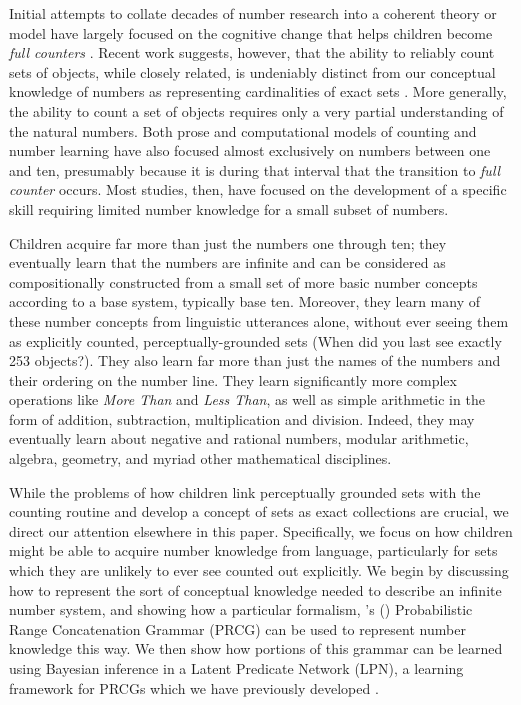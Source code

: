 \documentclass[10pt,letterpaper]{article}
\begin{document}
Initial attempts to collate decades of number research into a coherent
theory or model have largely focused on the cognitive change that
helps children become \emph{full counters}
\citep{Car2009,PianGoodTen2012}. Recent work suggests, however, that
the ability to reliably count sets of objects, while closely related,
is undeniably distinct from our conceptual knowledge of numbers as
representing cardinalities of exact sets
\citep{DavEngBar2012,izard2014toward,JarPianSpelEtAl2014}. More
generally, the ability to count a set of objects requires only a very
partial understanding of the natural numbers. Both prose and
computational models of counting and number learning have also focused
almost exclusively on numbers between one and ten, presumably because
it is during that interval that the transition to \emph{full counter}
occurs. Most studies, then, have focused on the development of a
specific skill requiring limited number knowledge for a small subset
of numbers.

Children acquire far more than just the numbers one through ten; they
eventually learn that the numbers are infinite and can be considered
as compositionally constructed from a small set of more basic number
concepts according to a base system, typically base ten. Moreover,
they learn many of these number concepts from linguistic utterances
alone, without ever seeing them as explicitly counted,
perceptually-grounded sets (When did you last see exactly 253
objects?). They also learn far more than just the names of the numbers
and their ordering on the number line. They learn significantly more
complex operations like \emph{More Than} and \emph{Less Than}, as well
as simple arithmetic in the form of addition, subtraction,
multiplication and division. Indeed, they may eventually learn about
negative and rational numbers, modular arithmetic, algebra, geometry,
and myriad other mathematical disciplines.

While the problems of how children link perceptually grounded sets
with the counting routine and develop a concept of sets as exact
collections are crucial, we direct our attention elsewhere in this
paper. Specifically, we focus on how children might be able to acquire
number knowledge from language, particularly for sets which they are
unlikely to ever see counted out explicitly. We begin by discussing
how to represent the sort of conceptual knowledge needed to describe
an infinite number system, and showing how a particular formalism,
\citeauthor{boullier2005range}'s (\citeyear{boullier2005range})
Probabilistic Range Concatenation Grammar (PRCG) can be used to
represent number knowledge this way. We then show how portions of this
grammar can be learned using Bayesian inference in a Latent Predicate
Network (LPN), a learning framework for PRCGs which we have previously
developed \citep{DecRulTenming}.
\end{document}
